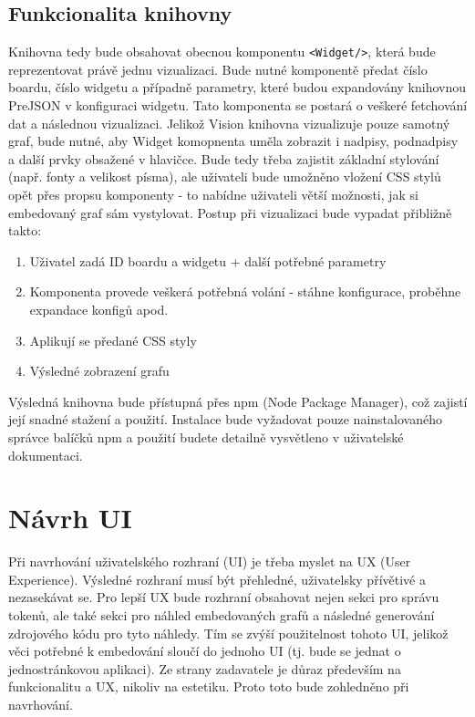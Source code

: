 \documentclass[czech, bc, kiv, he, iso690numb]{fasthesis}
\begin{document}
\subsection{Funkcionalita knihovny}
Knihovna tedy bude obsahovat obecnou komponentu \texttt{<Widget/>}, která bude reprezentovat právě jednu vizualizaci. Bude nutné komponentě předat číslo boardu, číslo widgetu a případně parametry, které 
budou expandovány knihovnou PreJSON v konfiguraci widgetu. Tato komponenta se postará o veškeré fetchování dat a následnou vizualizaci. Jelikož Vision knihovna vizualizuje pouze samotný graf, bude nutné, aby
Widget komopnenta uměla zobrazit i nadpisy, podnadpisy a další prvky obsažené v hlavičce. Bude tedy třeba zajistit základní stylování (např. fonty a velikost písma), ale uživateli bude umožněno vložení CSS stylů
opět přes propsu komponenty - to nabídne uživateli větší možnosti, jak si embedovaný graf sám vystylovat. Postup při vizualizaci bude vypadat přibližně takto:

\begin{enumerate}
	\item Uživatel zadá ID boardu a widgetu + další potřebné parametry
	\item Komponenta provede veškerá potřebná volání - stáhne konfigurace, proběhne expandace konfigů apod.
	\item Aplikují se předané CSS styly 
	\item Výsledné zobrazení grafu
\end{enumerate}

Výsledná knihovna bude přístupná přes npm (Node Package Manager), což zajistí její snadné stažení a použití. Instalace bude vyžadovat pouze nainstalovaného správce balíčků npm a použití budete
detailně vysvětleno v uživatelské dokumentaci.

\section{Návrh UI}

Při navrhování uživatelského rozhraní (UI) je třeba myslet na UX (User Experience). Výsledné rozhraní musí být přehledné, uživatelsky přívětivé a nezasekávat se. Pro lepší UX bude rozhraní 
obsahovat nejen sekci pro správu tokenů, ale také sekci pro náhled embedovaných grafů a následné generování zdrojového kódu pro tyto náhledy. Tím se zvýší použitelnost tohoto UI, jelikož 
věci potřebné k embedování sloučí do jednoho UI (tj. bude se jednat o jednostránkovou aplikaci). Ze strany zadavatele je důraz především na funkcionalitu a UX, nikoliv na estetiku. Proto toto bude zohledněno při navrhování.
\end{document}
